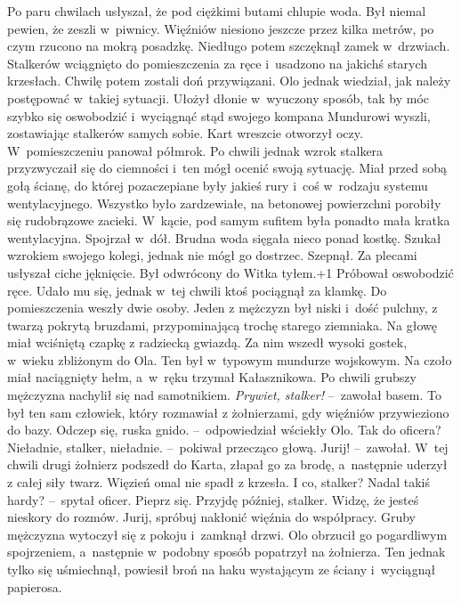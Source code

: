 \documentclass[../MAIN.tex]{subfiles}
\begin{document}
\pp
Po paru chwilach usłyszał, że pod ciężkimi butami chlupie woda. Był niemal pewien, że zeszli w~piwnicy. Więźniów niesiono jeszcze przez kilka metrów, po czym rzucono na mokrą posadzkę. Niedługo potem szczęknął zamek w~drzwiach. Stalkerów wciągnięto do pomieszczenia za ręce i~usadzono na jakichś starych krzesłach. Chwilę potem zostali doń przywiązani. Olo jednak wiedział, jak należy postępować w~takiej sytuacji. Ułożył dłonie w~wyuczony sposób, tak by móc szybko się oswobodzić i~wyciągnąć stąd swojego kompana
\pp
Mundurowi wyszli, zostawiając stalkerów samych sobie. Kart wreszcie otworzył oczy. W~pomieszczeniu panował półmrok. Po chwili jednak wzrok stalkera przyzwyczaił się do ciemności i~ten mógł ocenić swoją sytuację. Miał przed sobą gołą ścianę, do której pozaczepiane były jakieś rury i~coś w~rodzaju systemu wentylacyjnego. Wszystko było zardzewiałe, na betonowej powierzchni porobiły się rudobrązowe zacieki. W~kącie, pod samym sufitem była ponadto mała kratka wentylacyjna. Spojrzał w~dół. Brudna woda sięgała nieco ponad kostkę. Szukał wzrokiem swojego kolegi, jednak nie mógł go dostrzec. Szepnął. Za plecami usłyszał ciche jęknięcie. Był odwrócony do Witka tyłem.\looseness+1
\pp
Próbował oswobodzić ręce. Udało mu się, jednak w~tej chwili ktoś pociągnął za klamkę. Do pomieszczenia weszły dwie osoby. Jeden z mężczyzn był niski i~dość pulchny, z twarzą pokrytą bruzdami, przypominającą trochę starego ziemniaka. Na głowę miał wciśniętą czapkę z radziecką gwiazdą. Za nim wszedł wysoki gostek, w~wieku zbliżonym do Ola. Ten był w~typowym mundurze wojskowym. Na czoło miał naciągnięty hełm, a~w~ręku trzymał Kałasznikowa. Po chwili grubszy mężczyzna nachylił się nad samotnikiem.
\dd
\sd
\xx \textit{Prywiet, stalker!} --~zawołał basem. To był ten sam człowiek, który rozmawiał z żołnierzami, gdy więźniów przywieziono do bazy.
\xx Odczep się, ruska gnido. --~odpowiedział wściekły Olo.
\xx Tak do oficera? Nieładnie, stalker, nieładnie. --~pokiwał przecząco głową.
\xx Jurij! --~zawołał.
\qd
\hspace{8.3em} W~tej chwili drugi żołnierz podszedł do Karta, złapał go za brodę, a~następnie uderzył z całej siły twarz. Więzień omal nie spadł z krzesła.
\dd
\sd
\xx I co, stalker? Nadal takiś hardy? --~spytał oficer.
\xx Pieprz się.
\xx Przyjdę później, stalker. Widzę, że jesteś nieskory do rozmów. Jurij, spróbuj nakłonić więźnia do współpracy.
\qd
\hspace{11.4em} Gruby mężczyzna wytoczył się z pokoju i~zamknął drzwi. Olo obrzucił go pogardliwym spojrzeniem, a~następnie w~podobny sposób popatrzył na żołnierza. Ten jednak tylko się uśmiechnął, powiesił broń na haku wystającym ze ściany i~wyciągnął papierosa.
\end{document}
